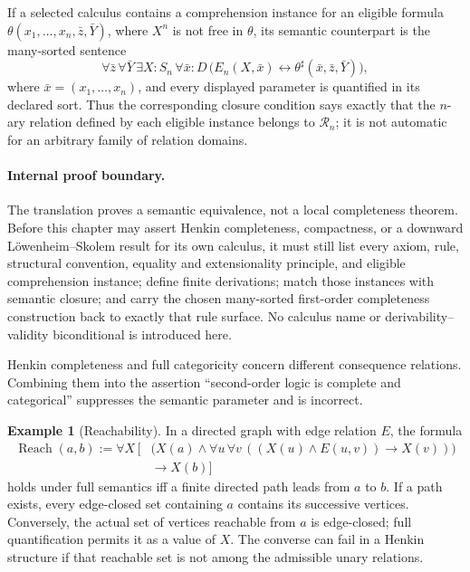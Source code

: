 \documentclass[11pt,oneside,openany]{book}
\theoremstyle{definition}
\newtheorem{example}[definition]{Example}
\theoremstyle{plain}
\theoremstyle{remark}
\newcommand{\defeq}{\mathrel{:=}}
\begin{document}
If a selected calculus contains a comprehension instance for an eligible
formula \(\theta(x_1,\ldots,x_n,\bar z,\bar Y)\), where \(X^n\) is not free
in \(\theta\), its semantic counterpart is the many-sorted sentence
\[
  \forall\bar z\,\forall\bar Y\,
  \exists X{:}S_n\,\forall\bar x{:}D\,
  \bigl(E_n(X,\bar x)\leftrightarrow
        \theta^\sharp(\bar x,\bar z,\bar Y)\bigr),
\]
where \(\bar x=(x_1,\ldots,x_n)\), and every displayed parameter is quantified
in its declared sort.  Thus the corresponding closure condition says exactly
that the \(n\)-ary relation defined by each eligible instance belongs to
\(\mathcal R_n\); it is not automatic for an arbitrary family of relation
domains.

\paragraph{Internal proof boundary.}
The translation proves a semantic equivalence, not a local completeness
theorem.  Before this chapter may assert Henkin completeness, compactness, or a
downward L\"owenheim--Skolem result for its own calculus, it must still list
every axiom, rule, structural convention, equality and extensionality
principle, and eligible comprehension instance; define finite derivations;
match those instances with semantic closure; and carry the chosen many-sorted
first-order completeness construction back to exactly that rule surface.  No
calculus name or derivability--validity biconditional is introduced here.

Henkin completeness and full categoricity concern different consequence
relations.  Combining them into the assertion ``second-order logic is complete
and categorical'' suppresses the semantic parameter and is incorrect.

\begin{example}[Reachability]
In a directed graph with edge relation \(E\), the formula
\[
\begin{aligned}
  \operatorname{Reach}(a,b)\defeq
  \forall X\,\bigl[&
    \bigl(X(a)\land
      \forall u\,\forall v\,
      ((X(u)\land E(u,v))\to X(v))\bigr)\\
    &\to X(b)
  \bigr]
\end{aligned}
\]
holds under full semantics iff a finite directed path leads from
\(a\) to \(b\).  If a path exists, every edge-closed set containing \(a\)
contains its successive vertices.  Conversely, the actual set of vertices
reachable from \(a\) is edge-closed; full quantification permits it as a value
of \(X\).  The converse can fail in a Henkin structure if that reachable set
is not among the admissible unary relations.
\end{example}
\end{document}
